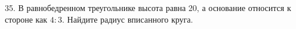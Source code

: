 35. В равнобедренном треугольнике высота равна 20, а основание относится к стороне как $4:3.$ Найдите радиус вписанного круга.\\
